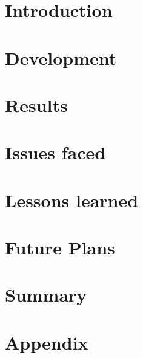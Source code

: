 \documentclass[
pdftex,                %
a4paper,                 %
11pt,                     %
parskip=half,         %
headsepline,        %
]
{scrartcl}
\begin{document}
	
	\tableofcontents
	
	\pagebreak
	
	\setcounter{page}{1}

  \section{Introduction}

  

  \pagebreak

  \section{Development}

  

  \pagebreak

  \section{Results}

  

  \section{Issues faced}

  

  \section{Lessons learned}

  

  \section{Future Plans}

  

  \pagebreak
	
	\section{Summary}
	
	
	
	\renewcommand{\refname}{Literatur}
	\begin{thebibliography}{xxxx}
		
	\end{thebibliography}

  \pagebreak

  \appendix

  \section*{Appendix}

  
	
\end{document}
